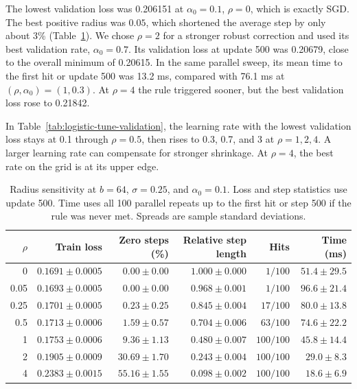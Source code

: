 \documentclass[11pt,a4paper]{article}
\begin{document}
The lowest validation loss was 0.206151 at $\alpha_0=0.1$, $\rho=0$,
which is exactly SGD. The best positive radius was $0.05$,
which shortened the average step by only about 3\%
(Table~\ref{tab:logistic-radius}). We chose $\rho=2$ for a stronger
robust correction and used its best validation rate, $\alpha_0=0.7$.
Its validation loss at update 500 was 0.20679, close to the overall
minimum of 0.20615. In the same parallel sweep, its mean time to the
first hit or update 500 was 13.2 ms, compared with 76.1 ms at
$(\rho,\alpha_0)=(1,0.3)$. At $\rho=4$ the rule triggered sooner,
but the best validation loss rose to 0.21842.

In Table~\ref{tab:logistic-tune-validation}, the learning rate with
the lowest validation loss stays at 0.1 through $\rho=0.5$, then rises
to 0.3, 0.7, and 3 at $\rho=1,2,4$. A larger learning rate can
compensate for stronger shrinkage. At $\rho=4$, the best rate on the
grid is at its upper edge.

\begin{table}[!htbp]
    \centering
    \small
    \caption{Radius sensitivity at $b=64$, $\sigma=0.25$, and
    $\alpha_0=0.1$. Loss and step statistics use update 500.
    Time uses all 100 parallel repeats up to the first hit or step 500
    if the rule was never met. Spreads are sample standard deviations.}
    \label{tab:logistic-radius}
    \smallskip
    \begin{tabular}{rrrrrr}
        \hline
        $\rho$ & Train loss & Zero steps (\%) & Relative step length
        & Hits & Time (ms) \\
        \hline
        0    & $0.1691\pm0.0005$ & $0.00\pm0.00$ & $1.000\pm0.000$ & $1/100$ & $51.4\pm29.5$ \\
        0.05 & $0.1693\pm0.0005$ & $0.00\pm0.00$ & $0.968\pm0.001$ & $1/100$ & $96.6\pm21.4$ \\
        0.25 & $0.1701\pm0.0005$ & $0.23\pm0.25$ & $0.845\pm0.004$ & $17/100$ & $80.0\pm13.8$ \\
        0.5  & $0.1713\pm0.0006$ & $1.59\pm0.57$ & $0.704\pm0.006$ & $63/100$ & $74.6\pm22.2$ \\
        1    & $0.1753\pm0.0006$ & $9.36\pm1.13$ & $0.480\pm0.007$ & $100/100$ & $45.8\pm14.4$ \\
        2    & $0.1905\pm0.0009$ & $30.69\pm1.70$ & $0.243\pm0.004$ & $100/100$ & $29.0\pm8.3$ \\
        4    & $0.2383\pm0.0015$ & $55.16\pm1.55$ & $0.098\pm0.002$ & $100/100$ & $18.6\pm6.9$ \\
        \hline
    \end{tabular}
\end{table}
\end{document}
